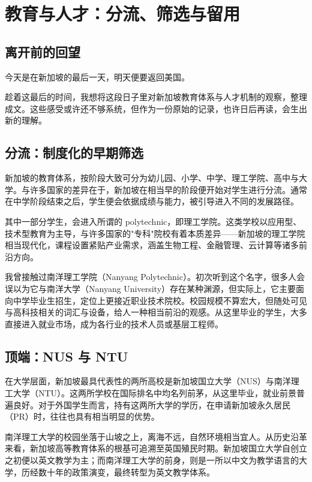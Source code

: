 \chapter{教育与人才：分流、筛选与留用}

\section{离开前的回望}

今天是在新加坡的最后一天，明天便要返回美国。

趁着这最后的时间，我想将这段日子里对新加坡教育体系与人才机制的观察，整理成文。这些感受或许还不够系统，但作为一份原始的记录，也许日后再读，会生出新的理解。

\section{分流：制度化的早期筛选}

新加坡的教育体系，按阶段大致可分为幼儿园、小学、中学、理工学院、高中与大学。与许多国家的差异在于，新加坡在相当早的阶段便开始对学生进行分流。通常在中学阶段结束之后，学生便会依据成绩与能力，被引导进入不同的发展路径。

其中一部分学生，会进入所谓的 polytechnic，即理工学院。这类学校以应用型、技术型教育为主导，与许多国家的"专科"院校有着本质差异——新加坡的理工学院相当现代化，课程设置紧贴产业需求，涵盖生物工程、金融管理、云计算等诸多前沿方向。

我曾接触过南洋理工学院（Nanyang Polytechnic）。初次听到这个名字，很多人会误以为它与南洋大学（Nanyang University）存在某种渊源，但实际上，它主要面向中学毕业生招生，定位上更接近职业技术院校。校园规模不算宏大，但随处可见与高科技相关的词汇与设备，给人一种相当前沿的观感。从这里毕业的学生，大多直接进入就业市场，成为各行业的技术人员或基层工程师。

\section{顶端：NUS 与 NTU}

在大学层面，新加坡最具代表性的两所高校是新加坡国立大学（NUS）与南洋理工大学（NTU）。这两所学校在国际排名中均名列前茅，从这里毕业，就业前景普遍良好。对于外国学生而言，持有这两所大学的学历，在申请新加坡永久居民（PR）时，往往也具有相当明显的优势。

南洋理工大学的校园坐落于山坡之上，离海不远，自然环境相当宜人。从历史沿革来看，新加坡高等教育体系的根基可追溯至英国殖民时期。新加坡国立大学自创立之初便以英文教学为主；而南洋理工大学的前身，则是一所以中文为教学语言的大学，历经数十年的政策演变，最终转型为英文教学体系。

